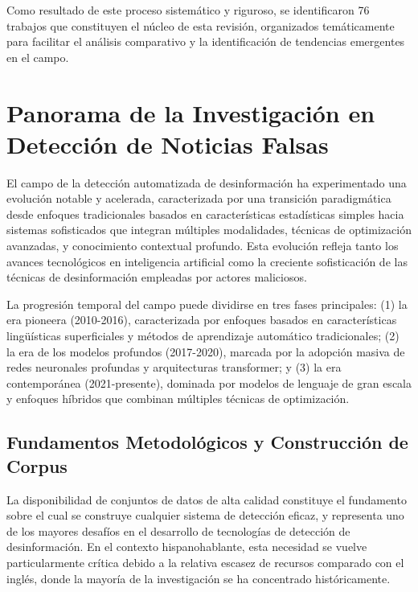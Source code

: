Como resultado de este proceso sistemático y riguroso, se identificaron 76 trabajos que constituyen el núcleo de esta revisión, organizados temáticamente para facilitar el análisis comparativo y la identificación de tendencias emergentes en el campo.

\section{Panorama de la Investigación en Detección de Noticias Falsas}
\label{sec:panorama_investigacion}

El campo de la detección automatizada de desinformación ha experimentado una evolución notable y acelerada, caracterizada por una transición paradigmática desde enfoques tradicionales basados en características estadísticas simples hacia sistemas sofisticados que integran múltiples modalidades, técnicas de optimización avanzadas, y conocimiento contextual profundo. Esta evolución refleja tanto los avances tecnológicos en inteligencia artificial como la creciente sofisticación de las técnicas de desinformación empleadas por actores maliciosos.

La progresión temporal del campo puede dividirse en tres fases principales: (1) la era pioneera (2010-2016), caracterizada por enfoques basados en características lingüísticas superficiales y métodos de aprendizaje automático tradicionales; (2) la era de los modelos profundos (2017-2020), marcada por la adopción masiva de redes neuronales profundas y arquitecturas transformer; y (3) la era contemporánea (2021-presente), dominada por modelos de lenguaje de gran escala y enfoques híbridos que combinan múltiples técnicas de optimización.

\subsection{Fundamentos Metodológicos y Construcción de Corpus}

La disponibilidad de conjuntos de datos de alta calidad constituye el fundamento sobre el cual se construye cualquier sistema de detección eficaz, y representa uno de los mayores desafíos en el desarrollo de tecnologías de detección de desinformación. En el contexto hispanohablante, esta necesidad se vuelve particularmente crítica debido a la relativa escasez de recursos comparado con el inglés, donde la mayoría de la investigación se ha concentrado históricamente.

